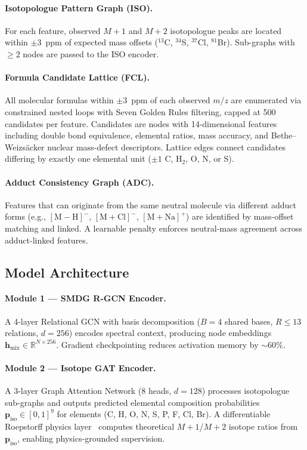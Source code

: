\documentclass[journal=jcisd8]{achemso}
\newcommand{\vect}[1]{\boldsymbol{#1}}
\begin{document}
\paragraph{Isotopologue Pattern Graph (ISO).}
For each feature, observed $M{+}1$ and $M{+}2$ isotopologue peaks are located
within $\pm3$~ppm of expected mass offsets ($^{13}$C, ${}^{34}$S, ${}^{37}$Cl, ${}^{81}$Br).
Sub-graphs with $\ge2$ nodes are passed to the ISO encoder.

\paragraph{Formula Candidate Lattice (FCL).}
All molecular formulas within $\pm3$~ppm of each observed $m/z$ are enumerated via
constrained nested loops with Seven Golden Rules filtering, capped at 500 candidates per
feature.  Candidates are nodes with 14-dimensional features including double bond
equivalence, elemental ratios, mass accuracy, and
Bethe--Weizs{\"a}cker nuclear mass-defect descriptors.
Lattice edges connect candidates differing by exactly one elemental unit
($\pm1$ C, H$_2$, O, N, or S).

\paragraph{Adduct Consistency Graph (ADC).}
Features that can originate from the same neutral molecule via different adduct
forms (e.g., $[\text{M}-\text{H}]^-$, $[\text{M}+\text{Cl}]^-$,
$[\text{M}+\text{Na}]^+$) are identified by mass-offset matching and linked.
A learnable penalty enforces neutral-mass agreement across adduct-linked features.

\subsection{Model Architecture}
\label{sec:architecture}

\paragraph{Module 1 --- SMDG R-GCN Encoder.}
A 4-layer Relational GCN with basis decomposition ($B=4$ shared bases, $R\le13$ relations,
$d=256$) encodes spectral context, producing node embeddings
$\vect{h}_\text{mix} \in \mathbb{R}^{N \times 256}$.  Gradient checkpointing reduces
activation memory by $\sim$60\%.

\paragraph{Module 2 --- Isotope GAT Encoder.}
A 3-layer Graph Attention Network (8 heads, $d=128$) processes isotopologue sub-graphs
and outputs predicted elemental composition probabilities
$\vect{p}_\text{iso} \in [0,1]^9$ for elements
(C, H, O, N, S, P, F, Cl, Br).  A differentiable Roepstorff physics layer~\cite{Roepstorff1984}
computes theoretical $M{+}1$/$M{+}2$ isotope ratios from $\vect{p}_\text{iso}$,
enabling physics-grounded supervision.
\end{document}
